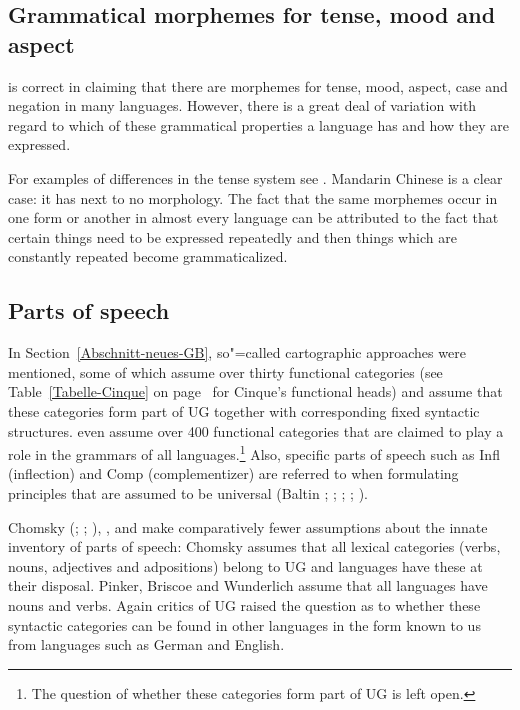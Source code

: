 \subsection{Grammatical morphemes for tense, mood and aspect}

\citet[]{Pinker94a} is correct in claiming that there are morphemes for tense, mood, aspect, case and negation in many languages. However, there is a great
deal of variation with regard to which of these grammatical properties a language has and
how they are expressed.

For examples of differences in the tense system see . Mandarin
Chinese is a clear case: it has next to no morphology. The fact that the same morphemes occur in one form or another in almost every language
can be attributed to the fact that certain things need to be expressed repeatedly and then things which are constantly repeated become grammaticalized.


\subsection{Parts of speech}
\label{Abschnitt-UG-Wortarten}

In Section~\ref{Abschnitt-neues-GB}, so"=called cartographic approaches were mentioned, some of which assume over thirty functional categories
(see Table~\ref{Tabelle-Cinque} on page~\pageref{Tabelle-Cinque} for Cinque's functional heads) and assume that these categories form part of UG together with corresponding fixed syntactic structures.
\citet[, 57]{CR2010a} even assume over 400 functional categories
that are claimed to play a role in the grammars of all languages.\footnote{%
	The question of whether these categories form part of UG is left open.
}
Also, specific parts of speech such as \mbox{Infl} (inflection) and
Comp (complementizer) are referred to when formulating principles that are assumed to be universal (Baltin \citeyear[]{Baltin81a}; \citeyear{Baltin2006a}; \citealp{Rizzi82b}; \citealp[]{Chomsky86b};
\citealp[]{Hornstein2013a}). 

Chomsky (\citeyear[]{Chomsky88a-u}; \citeyear{Chomsky91a-u};
\citeyear[]{Chomsky95a-u}), \citet[, 286]{Pinker94a}, \citet[]{Briscoe2000a} and
\citet[]{Wunderlich2004a} make comparatively fewer assumptions about the innate inventory of parts of speech:
Chomsky assumes that all lexical categories (verbs,  nouns,
adjectives and adpositions) belong to UG and languages have these at their disposal.
Pinker, Briscoe and Wunderlich assume that all languages have nouns and verbs.
Again critics of UG raised the question as to whether these syntactic categories can be found in other languages in the form known to us from languages such as German and English.

